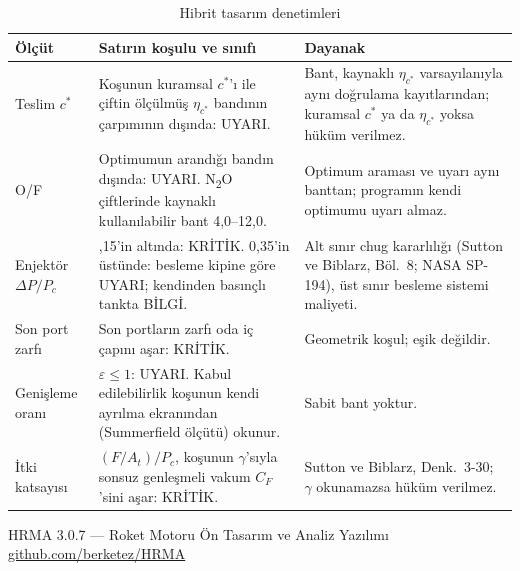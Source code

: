 \documentclass[11pt,a4paper]{article}
\newcommand{\ui}[1]{\textsf{#1}}
\begin{document}
\begin{table}[htbp]
\centering\small
\caption{Hibrit tasarım denetimleri}\label{tab:tasarimbant}
\begin{tabular}{@{}>{\raggedright\arraybackslash}p{3.6cm}>{\raggedright\arraybackslash}p{6.4cm}>{\raggedright\arraybackslash}p{5.6cm}@{}}
\toprule
\textbf{Ölçüt} & \textbf{Satırın koşulu ve sınıfı} & \textbf{Dayanak} \\
\midrule
Teslim $c^*$ & Koşunun kuramsal $c^*$'ı ile çiftin ölçülmüş $\eta_{c^*}$ bandının çarpımının dışında: \ui{UYARI}. & Bant, kaynaklı $\eta_{c^*}$ varsayılanıyla aynı doğrulama kayıtlarından; kuramsal $c^*$ ya da $\eta_{c^*}$ yoksa hüküm verilmez. \\
O/F & Optimumun arandığı bandın dışında: \ui{UYARI}. N\textsubscript{2}O çiftlerinde kaynaklı kullanılabilir bant 4,0--12,0. & Optimum araması ve uyarı aynı banttan; programın kendi optimumu uyarı almaz. \\
Enjektör $\Delta P/P_c$ & 0,15'in altında: \ui{KRİTİK}. 0,35'in üstünde: besleme kipine göre \ui{UYARI}; kendinden basınçlı tankta \ui{BİLGİ}. & Alt sınır chug kararlılığı (Sutton ve Biblarz, Böl.~8; NASA SP-194), üst sınır besleme sistemi maliyeti. \\
Son port zarfı & Son portların zarfı oda iç çapını aşar: \ui{KRİTİK}. & Geometrik koşul; eşik değildir. \\
Genişleme oranı & $\varepsilon \leq 1$: \ui{UYARI}. Kabul edilebilirlik koşunun kendi ayrılma ekranından (Summerfield ölçütü) okunur. & Sabit bant yoktur. \\
İtki katsayısı & $(F/A_t)/P_c$, koşunun $\gamma$'sıyla sonsuz genleşmeli vakum $C_F$'sini aşar: \ui{KRİTİK}. & Sutton ve Biblarz, Denk.~3-30; $\gamma$ okunamazsa hüküm verilmez. \\
\bottomrule
\end{tabular}
\end{table}

\vspace{1cm}
\begin{center}
\color{hrmagray}\small
HRMA 3.0.7 --- Roket Motoru Ön Tasarım ve Analiz Yazılımı\\
\href{https://github.com/berketez/HRMA}{github.com/berketez/HRMA}
\end{center}
\end{document}
